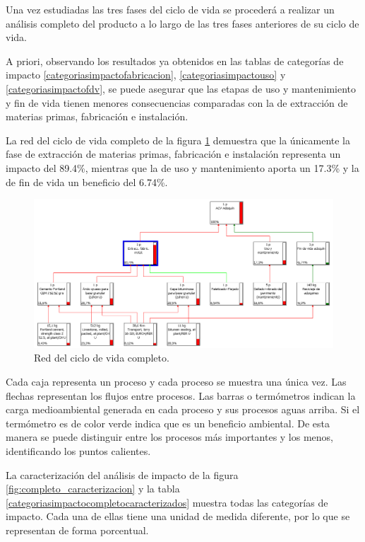 Una vez estudiadas las tres fases del ciclo de vida se procederá a realizar un análisis completo del producto a lo largo de las tres fases anteriores de su ciclo de vida.

A priori, observando los resultados ya obtenidos en las tablas de categorías de impacto \ref{categoriasimpactofabricacion}, \ref{categoriasimpactouso} y \ref{categoriasimpactofdv}, se puede asegurar que las etapas de uso y mantenimiento y fin de vida tienen menores consecuencias comparadas con la de extracción de materias primas, fabricación e instalación.

La red del ciclo de vida completo de la figura \ref{fig:completo_red} demuestra que la únicamente la fase de extracción de materias primas, fabricación e instalación representa un impacto del 89.4\%, mientras que la de uso y mantenimiento aporta un 17.3\% y la de fin de vida un beneficio del 6.74\%.

\begin{figure}[!htb]
\centering
\includegraphics[width=14cm]{img/completo_red.png}
\caption{Red del ciclo de vida completo.}
\label{fig:completo_red}
\end{figure}

Cada caja representa un proceso y cada proceso se muestra una única vez. Las flechas representan los flujos entre procesos. Las barras o termómetros indican la carga medioambiental generada en cada proceso y sus procesos aguas arriba. Si el termómetro es de color verde indica que es un beneficio ambiental. De esta manera se puede distinguir entre los procesos más importantes y los menos, identificando los puntos calientes.

La caracterización del análisis de impacto de la figura \ref{fig:completo_caracterizacion} y la tabla \ref{categoriasimpactocompletocaracterizados} muestra todas las categorías de impacto. Cada una de ellas tiene una unidad de medida diferente, por lo que se representan de forma porcentual.

